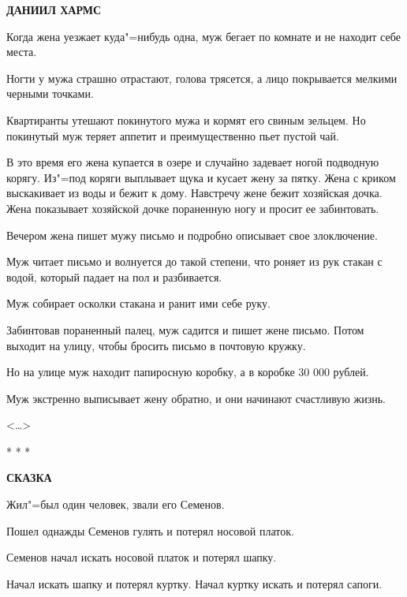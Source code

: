 \documentclass{article}
\begin{document}
\author{}
\title{}
\date{}

\begin{center}\textbf{\LARGE ДАНИИЛ ХАРМС}\end{center}
\vspace{1cm}

Когда жена уезжает куда"=нибудь одна, муж бегает по комнате и не находит себе
места.

Ногти у мужа страшно отрастают, голова трясется, а лицо покрывается мелкими
черными точками.

Квартиранты утешают покинутого мужа и кормят его свиным зельцем. Но покинутый
муж теряет аппетит и преимущественно пьет пустой чай.

В это время его жена купается в озере и случайно задевает ногой подводную
корягу. Из"=под коряги выплывает щука и кусает жену за пятку. Жена с криком
выскакивает из воды и бежит к дому. Навстречу жене бежит хозяйская дочка. Жена
показывает хозяйской дочке пораненную ногу и просит ее забинтовать.

Вечером жена пишет мужу письмо и подробно описывает свое злоключение.

Муж читает письмо и волнуется до такой степени, что роняет из рук стакан с
водой, который падает на пол и разбивается.

Муж собирает осколки стакана и ранит ими себе руку.

Забинтовав пораненный палец, муж садится и пишет жене письмо. Потом выходит на
улицу, чтобы бросить письмо в почтовую кружку.

Но на улице муж находит папиросную коробку, а в коробке 30 000 рублей.

Муж экстренно выписывает жену обратно, и они начинают счастливую жизнь.

\begin{flushright}<\dots>\end{flushright}

\begin{center}* * *\end{center}

\begin{center} \textbf{СКАЗКА}\end{center}

Жил"=был один человек, звали его Семенов.

Пошел однажды Семенов гулять и потерял носовой платок.

Семенов начал искать носовой платок и потерял шапку.

Начал искать шапку и потерял куртку. Начал куртку искать и потерял сапоги.
\end{document}
